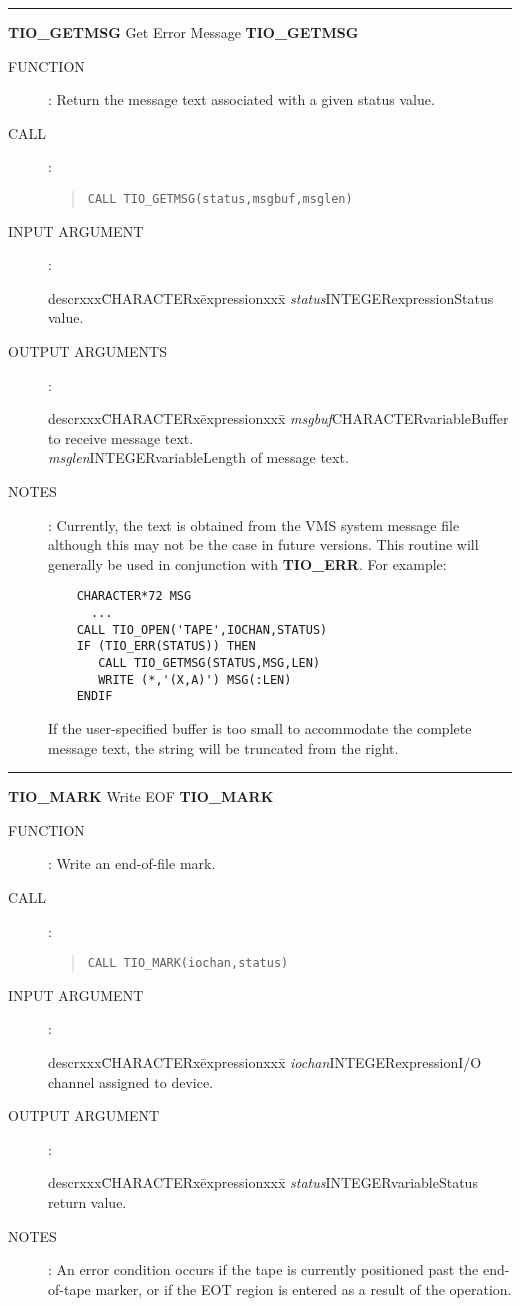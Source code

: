 \goodbreak
\rule{\textwidth}{0.3mm}
{\Large {\bf TIO\_GETMSG} \hfill Get Error Message \hfill {\bf TIO\_GETMSG}}
\begin{description}
\item [FUNCTION]:
Return the message text associated with a given status value.
\item [CALL]:
\begin{quote}
{\tt CALL TIO\_GETMSG(status,msgbuf,msglen)}
\end{quote}
\item [INPUT ARGUMENT]:
\begin{tabbing}
descrxxx\=CHARACTERx\=expressionxxx\=\kill
{\em status}\>INTEGER\>expression\>Status value.
\end{tabbing}
\item [OUTPUT ARGUMENTS]:
\begin{tabbing}
descrxxx\=CHARACTERx\=expressionxxx\=\kill
{\em msgbuf}\>CHARACTER\>variable\>Buffer to receive message text.\\
{\em msglen}\>INTEGER\>variable\>Length of message text.
\end{tabbing}
\item [NOTES]:
Currently, the text is obtained from the VMS system message file although this
may not be the case in future versions.
This routine will generally be used in conjunction with {\bf TIO\_ERR}.
For example:
\begin{verbatim}
    CHARACTER*72 MSG
      ...
    CALL TIO_OPEN('TAPE',IOCHAN,STATUS)
    IF (TIO_ERR(STATUS)) THEN
       CALL TIO_GETMSG(STATUS,MSG,LEN)
       WRITE (*,'(X,A)') MSG(:LEN)
    ENDIF
\end{verbatim}
If the user-specified buffer is too small to accommodate the complete message
text, the string will be truncated from the right.
\end{description}
\goodbreak
\rule{\textwidth}{0.3mm}
{\Large {\bf TIO\_MARK} \hfill Write EOF \hfill {\bf TIO\_MARK}}
\begin{description}
\item [FUNCTION]:
Write an end-of-file mark.
\item [CALL]:
\begin{quote}
{\tt CALL TIO\_MARK(iochan,status)}
\end{quote}
\item [INPUT ARGUMENT]:
\begin{tabbing}
descrxxx\=CHARACTERx\=expressionxxx\=\kill
{\em iochan}\>INTEGER\>expression\>I/O channel assigned to device.
\end{tabbing}
\item [OUTPUT ARGUMENT]:
\begin{tabbing}
descrxxx\=CHARACTERx\=expressionxxx\=\kill
{\em status}\>INTEGER\>variable\>Status return value.
\end{tabbing}
\item [NOTES]:
An error condition occurs if the tape is currently positioned past the
end-of-tape marker, or if the EOT region is entered as a result of the
operation.
\end{description}
